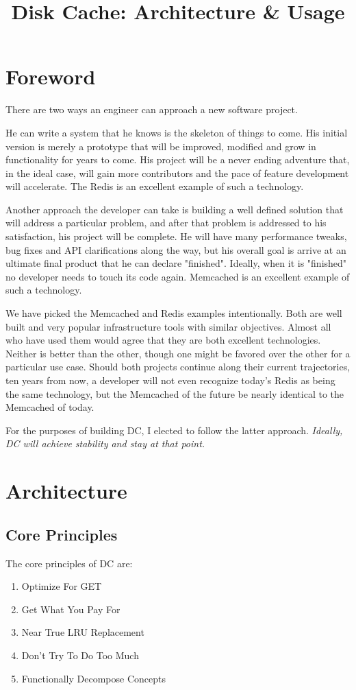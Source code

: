 \documentclass{article}
\title {Disk Cache: Architecture \& Usage}
\begin{document}
\maketitle

\section{Foreword}
There are two ways an engineer can approach a new software project. 

He can write a system that he knows is the skeleton of things to come. His initial version is merely a prototype that will be improved, modified and grow in functionality for years to come. His project will be a never ending adventure that, in the ideal case, will gain more contributors and the pace of feature development will accelerate. The Redis is an excellent example of such a technology. 

Another approach the developer can take is building a well defined solution that will address a particular problem, and after that problem is addressed to his satisfaction, his project will be complete. He will have many performance tweaks, bug fixes and API clarifications along the way, but his overall goal is arrive at an ultimate final product that he can declare "finished".  Ideally, when it is "finished" no  developer needs to touch its code again. Memcached is an excellent example of such a technology. 

We have picked the Memcached and Redis examples intentionally. Both are well built and very popular infrastructure tools with similar objectives. Almost all who have used them would agree that they are both excellent technologies. Neither is better than the other, though one might be favored over the other for a particular use case. Should both projects continue along their current trajectories, ten years from now, a developer will not even recognize today's Redis as being the same technology, but the Memcached of the future be nearly identical to the Memcached of today.

For the purposes of building DC, I elected to follow the latter approach.  \emph{Ideally, DC will achieve stability and stay at that point.}

\section{Architecture}
\subsection{Core Principles}
The core principles of DC are:
\begin{enumerate}
\item Optimize For GET
\item Get What You Pay For
\item Near True LRU Replacement
\item Don't Try To Do Too Much
\item Functionally Decompose Concepts
\end{enumerate}
\end{document}
